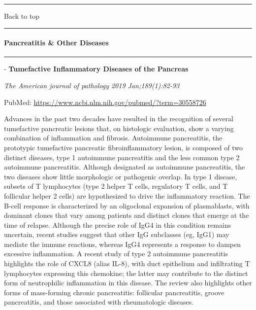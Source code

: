 \documentclass[]{article}
\let\oldparagraph\paragraph
\renewcommand{\paragraph}[1]{\oldparagraph{#1}\mbox{}}
\begin{document}
{}

{}

\begin{center}\rule{0.5\linewidth}{\linethickness}\end{center}

Back to top

\begin{center}\rule{0.5\linewidth}{\linethickness}\end{center}

\pagebreak

\hypertarget{pancreatitis-other-diseases}{%
\paragraph{Pancreatitis \& Other
Diseases}\label{pancreatitis-other-diseases}}

\begin{center}\rule{0.5\linewidth}{\linethickness}\end{center}

 - \textbf{Tumefactive Inflammatory Diseases of the Pancreas}

\emph{The American journal of pathology 2019 Jan;189(1):82-93}

PubMed: \url{https://www.ncbi.nlm.nih.gov/pubmed/?term=30558726}

Advances in the past two decades have resulted in the recognition of
several tumefactive pancreatic lesions that, on histologic evaluation,
show a varying combination of inflammation and fibrosis. Autoimmune
pancreatitis, the prototypic tumefactive pancreatic fibroinflammatory
lesion, is composed of two distinct diseases, type 1 autoimmune
pancreatitis and the less common type 2 autoimmune pancreatitis.
Although designated as autoimmune pancreatitis, the two diseases show
little morphologic or pathogenic overlap. In type 1 disease, subsets of
T lymphocytes (type 2 helper T cells, regulatory T cells, and T
follicular helper 2 cells) are hypothesized to drive the inflammatory
reaction. The B-cell response is characterized by an oligoclonal
expansion of plasmablasts, with dominant clones that vary among patients
and distinct clones that emerge at the time of relapse. Although the
precise role of IgG4 in this condition remains uncertain, recent studies
suggest that other IgG subclasses (eg, IgG1) may mediate the immune
reactions, whereas IgG4 represents a response to dampen excessive
inflammation. A recent study of type 2 autoimmune pancreatitis
highlights the role of CXCL8 (alias IL-8), with duct epithelium and
infiltrating T lymphocytes expressing this chemokine; the latter may
contribute to the distinct form of neutrophilic inflammation in this
disease. The review also highlights other forms of mass-forming chronic
pancreatitis: follicular pancreatitis, groove pancreatitis, and those
associated with rheumatologic diseases.
\end{document}
